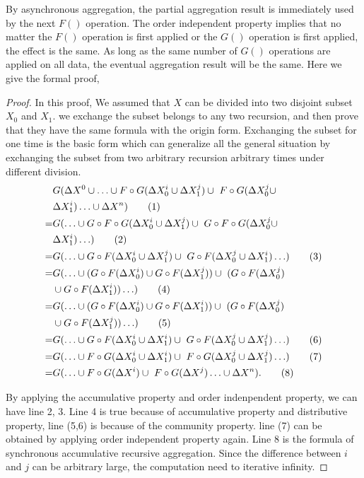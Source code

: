 By asynchronous aggregation, the partial aggregation result is immediately used by the next $F()$ operation. The order independent property implies that no matter the $F()$ operation is first applied or the $G()$ operation is first applied, the effect is the same. As long as the same number of $G()$ operations are applied on all data, the eventual aggregation result will be the same.%
Here we give the formal proof, 
\begin{proof}
	\label{sec:app:proof:correct}
	In this proof, We assumed that $X$ can be divided into two disjoint subset $X_0$ and $X_1$. we exchange the subset belongs to any two  recursion, and then prove that they have the same formula with the origin form. Exchanging the subset for one time is the basic form which can generalize all the general situation by exchanging the subset from two arbitrary recursion arbitrary times under different division.
	\begin{align}
	&G(\Delta X^0\cup \ldots \cup F\circ G(\Delta X^{i}_0 \cup \Delta X^{j}_1)\cup\ F\circ G(\Delta X^{j}_0 \cup \notag\\ &\Delta X^{i}_1) \ldots\cup \Delta X^n)\tag{1} \\
	=&G( \ldots \cup G \circ F\circ G(\Delta X^{i}_0 \cup \Delta X^{{j}}_1)\cup\ G \circ F\circ G(\Delta X^{{j}}_0 \cup \notag\\ &\Delta X^{i}_1) \ldots)\tag{2} \\
	=&G( \ldots \cup G \circ F(\Delta X^{i}_0 \cup \Delta X^{{j}}_1)\cup\ G \circ F(\Delta X^{{j}}_0 \cup \Delta X^{{i}}_1) \ldots)\tag{3} \\
	=&G( \ldots \cup (G\circ F(\Delta X^{i}_0) \cup G\circ F(\Delta X^{{j}}_1))\cup\ (G \circ F(\Delta X^{{j}}_0) \notag\\ &\cup G \circ F(\Delta X^{i}_1)) \ldots )\tag{4} \\
	=&G( \ldots \cup (G\circ F(\Delta X^{i}_0) \cup G\circ F(\Delta X^{i}_1))\cup\ (G \circ F(\Delta X^{{j}}_0) \notag\\ &\cup G  \circ F(\Delta X^{{j}}_1)) \ldots )\tag{5} \\
	=&G( \ldots \cup G \circ F(\Delta X^{i}_0 \cup \Delta X^{{i}}_1)\cup\ G \circ F(\Delta X^{{j}}_0 \cup \Delta X^{{j}}_1) \ldots)\tag{6} \\
	=&G( \ldots \cup F \circ G(\Delta X^{i}_0 \cup \Delta X^{{i}}_1)\cup\ F \circ G(\Delta X^{{j}}_0 \cup \Delta X^{{j}}_1) \ldots)\tag{7} \\
	=&G(\ldots \cup F \circ G(\Delta X^i)\cup\ F \circ G(\Delta X^{j}) \ldots\cup \Delta X^n).\tag{8}
	\end{align}
	
	By applying the accumulative property and order indenpendent property, we can have line 2, 3. Line 4 is true because of accumulative property
	and distributive property, line (5,6) is because of the community property. line (7) can be obtained by applying order independent property again.
	Line 8 is the formula of synchronous accumulative recursive aggregation. Since the difference between $i$ and $j$ can be arbitrary large, the computation need to iterative infinity.
	\end{proof}
